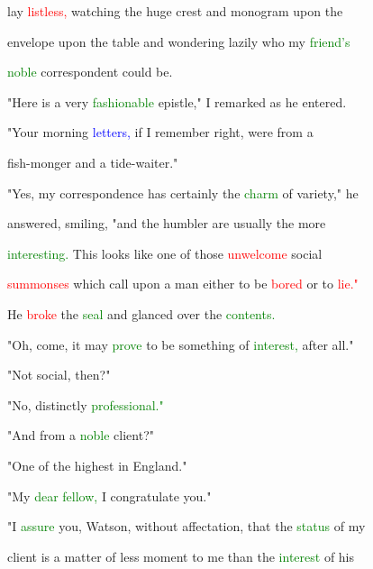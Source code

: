  lay \textcolor{red}{listless,} \textcolor{BurntOrange}{watching} the huge crest and monogram upon the

 envelope upon the table and wondering lazily who my \textcolor{green}{friend's}

 \textcolor{green}{noble} correspondent could be.



 "Here is a very \textcolor{green}{fashionable} epistle," I remarked as he entered.

 "Your morning \textcolor{blue}{letters,} if I remember right, were from a

 fish-monger and a tide-waiter."



 "Yes, my \textcolor{BurntOrange}{correspondence} has certainly the \textcolor{green}{charm} of variety," he

 answered, \textcolor{BurntOrange}{smiling,} "and the humbler are usually the more

 \textcolor{green}{interesting.} This looks like one of those \textcolor{red}{unwelcome} social

 \textcolor{red}{summonses} which call upon a man either to be \textcolor{red}{bored} or to \textcolor{red}{lie."}



 He \textcolor{red}{broke} the \textcolor{green}{seal} and glanced over the \textcolor{green}{contents.}



 "Oh, come, it may \textcolor{green}{prove} to be something of \textcolor{green}{interest,} after all."



 "Not social, then?"



 "No, distinctly \textcolor{green}{professional."}



 "And from a \textcolor{green}{noble} client?"



 "One of the highest in England."



 "My \textcolor{green}{dear} \textcolor{green}{fellow,} I congratulate you."



 "I \textcolor{green}{assure} you, Watson, without affectation, that the \textcolor{green}{status} of my

 client is a matter of less moment to me than the \textcolor{green}{interest} of his

